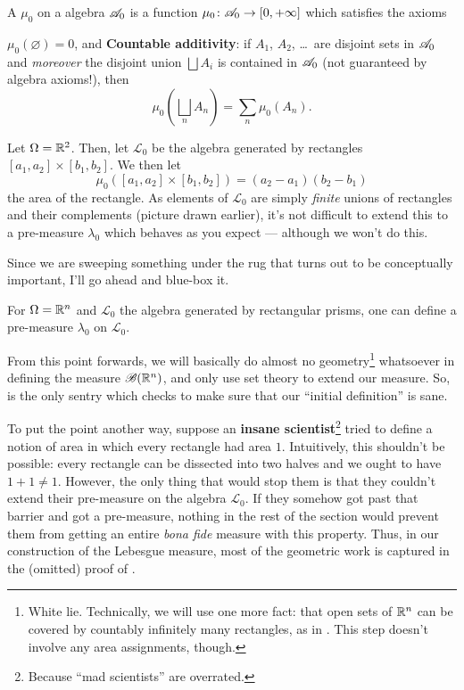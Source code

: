 \begin{definition}
	A  $\mu_0$ on a algebra $\mathscr A_0$
	is a function $\mu_0 \colon \mathscr A_0 \to [0, +\infty]$
	which satisfies the axioms
	\begin{itemize}
		\ii $\mu_0(\varnothing) = 0$, and
		\ii \textbf{Countable additivity}:
		if $A_1$, $A_2$, \dots\ are disjoint sets in $\mathscr A_0$
		and \emph{moreover} the disjoint union $\bigsqcup A_i$
		is contained in $\mathscr A_0$ (not guaranteed by algebra axioms!),
		then
		\[ \mu_0\left( \bigsqcup_n A_n \right) = \sum_n \mu_0(A_n). \]
	\end{itemize}
\end{definition}

\begin{example}
	Let $\Omega = \mathbb R^2$.
	Then, let $\mathcal{L}_0$ be the algebra generated by rectangles
	$[a_1, a_2] \times [b_1, b_2]$.
	We then let
	\[ \mu_0\left( [a_1, a_2] \times [b_1, b_2] \right)
	= (a_2-a_1)(b_2-b_1) \]
	the area of the rectangle.
	As elements of $\mathcal{L}_0$ are simply \emph{finite} unions
	of rectangles and their complements (picture drawn earlier),
	it's not difficult to extend this to a pre-measure $\lambda_0$
	which behaves as you expect --- although we won't do this.
\end{example}

Since we are sweeping something under the rug that
turns out to be conceptually important,
I'll go ahead and blue-box it.
\begin{proposition}
	\label{prop:lebesgue_rectangle}
	For $\Omega = \mathbb R^n$ and $\mathcal{L}_0$
	the algebra generated by rectangular prisms,
	one can define a pre-measure $\lambda_0$ on $\mathcal{L}_0$.
\end{proposition}
From this point forwards, we will basically do
almost no geometry\footnote{White lie.
	Technically, we will use one more fact:
	that open sets of $\mathbb R^n$ can be covered by countably
	infinitely many rectangles,
	as in .
	This step doesn't involve any area assignments, though.}
whatsoever in defining the measure $\mathscr B(\mathbb R^n)$,
and only use set theory to extend our measure.
So,  is the only sentry
which checks to make sure that our ``initial definition'' is sane.

To put the point another way,
suppose an \textbf{insane scientist}\footnote{Because
	``mad scientists'' are overrated.}
tried to define a notion
of area in which every rectangle had area $1$.
Intuitively, this shouldn't be possible:
every rectangle can be dissected into two halves
and we ought to have $1+1 \neq 1$.
However, the only thing that would stop them is that they couldn't
extend their pre-measure on the algebra $\mathcal{L}_0$.
If they somehow got past that barrier and got a pre-measure,
nothing in the rest of the section would prevent them
from getting an entire \emph{bona fide} measure with this property.
Thus, in our construction of the Lebesgue measure,
most of the geometric work is captured in the (omitted) proof
of .

